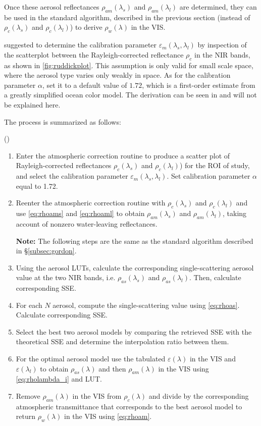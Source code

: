 Once these aerosol reflectances $\rho_{am}(\lambda_s)$ and $\rho_{am}(\lambda_l)$ are determined, they can be used in the standard algorithm, described in the previous section (instead of $\rho_c(\lambda_s)$ and $\rho_c(\lambda_l)$) to derive $\rho_w(\lambda)$ in the VIS.

\cite{Ruddick:2000bs} suggested to determine the calibration parameter $\varepsilon_m(\lambda_s,\lambda_l)$ by inspection of the scatterplot between the Rayleigh-corrected reflectance $\rho_c$ in the NIR bands, as shown in \autoref{fig:ruddickplot}. This assumption is only valid for small scale space, where the aerosol type varies only weakly in space. As for the calibration parameter $\alpha$, \cite{Ruddick:2000bs} set it to a default value of $1.72$, which is a first-order estimate from a greatly simplified ocean color model. The derivation can be seen in \cite{Ruddick:2000bs} and will not be explained here.

The process is summarized as follows:

(\cite{Ruddick:2000bs})
\begin{enumerate}[itemsep=2pt,parsep=2pt]
  \item Enter the atmospheric correction routine to produce a scatter plot of Rayleigh-corrected reflectances $\rho_c(\lambda_s)$ and $\rho_c(\lambda_l)$) for the ROI of study, and select the calibration parameter $\varepsilon_m(\lambda_s,\lambda_l)$. Set calibration parameter $\alpha$ equal to 1.72.

  \item Reenter the atmospheric correction routine with $\rho_c(\lambda_s)$ and $\rho_c(\lambda_l)$ and use \autoref{eq:rhoams} and \autoref{eq:rhoaml} to obtain $\rho_{am}(\lambda_s)$ and $\rho_{am}(\lambda_l)$, taking account of nonzero water-leaving reflectances.

  {\bf Note:} The following steps are the same as the standard algorithm described in \S\ref{subsec:gordon}.

  \item Using the aerosol LUTs, calculate the corresponding single-scattering aerosol value at the two NIR bands, i.e. $\rho_{as}(\lambda_s)$ and $\rho_{as}(\lambda_l)$. Then, calculate corresponding SSE.

  \item For each $N$ aerosol, compute the single-scattering value using \autoref{eq:rhoas}. Calculate corresponding SSE.
  \item Select the best two aerosol models by comparing the retrieved SSE with the theoretical SSE and determine the interpolation ratio between them.
  \item For the optimal aerosol model use the tabulated $\varepsilon(\lambda)$ in the VIS and $\varepsilon(\lambda_l)$ to obtain $\rho_{as}(\lambda)$ and then $\rho_{am}(\lambda)$ in the VIS using \autoref{eq:rholambda_i} and LUT.
  \item Remove $\rho_{am}(\lambda)$ in the VIS from $\rho_c(\lambda)$ and divide by the corresponding atmospheric transmittance that corresponds to the best aerosol model to return $\rho_w(\lambda)$ in the VIS using \autoref{eq:rhoam}.
\end{enumerate}

